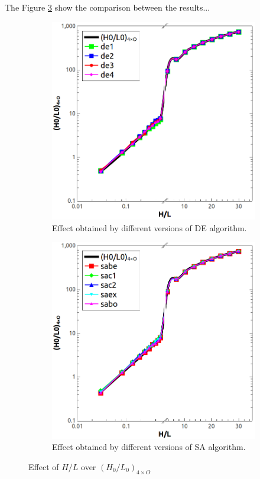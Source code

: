 \documentclass[10pt,fleqn,a4paper,twoside]{article}
\begin{document}
The Figure \ref{figure04} show the comparison between the results...

\begin{figure}[h!]
\centering
	\begin{subfigure}{0.52\textwidth}
		\centering
		\includegraphics[width=1\linewidth]{imgs/de/g_hl_h0l0_1.png}
		\caption{ {\small Effect obtained by different versions of DE algorithm.}}
		\label{figure04:sub1}
	\end{subfigure}%
	\begin{subfigure}{0.52\textwidth}
		\centering
		\includegraphics[width=1\linewidth]{imgs/sa/g_hl_h0l0_1.png}
		\caption{ {\small Effect obtained by different versions of SA algorithm.}}
		\label{figure04:sub2}
	\end{subfigure}%
\caption{Effect of $H/L$ over ${(H_{0}/L_{0})_{4\times O}}$}
\label{figure04}
\end{figure}
\end{document}
